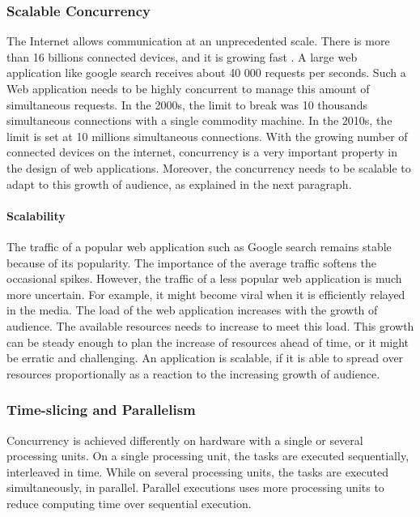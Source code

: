 
\subsubsection{Scalable Concurrency}

The Internet allows communication at an unprecedented scale.
There is more than 16 billions connected devices, and it is growing fast \cite{Hilbert2011}.
A large web application like google search receives about 40 000 requests per seconds.
Such a Web application needs to be highly concurrent to manage this amount of simultaneous requests.
In the 2000s, the limit to break was 10 thousands simultaneous connections with a single commodity machine.
In the 2010s, the limit is set at 10 millions simultaneous connections.
With the growing number of connected devices on the internet, concurrency is a very important property in the design of web applications.
Moreover, the concurrency needs to be scalable to adapt to this growth of audience, as explained in the next paragraph.

\paragraph{Scalability}

The traffic of a popular web application such as Google search remains stable because of its popularity.
The importance of the average traffic softens the occasional spikes.
However, the traffic of a less popular web application is much more uncertain.
For example, it might become viral when it is efficiently relayed in the media.
The load of the web application increases with the growth of audience.
The available resources needs to increase to meet this load.
This growth can be steady enough to plan the increase of resources ahead of time, or it might be erratic and challenging.
An application is scalable, if it is able to spread over resources proportionally as a reaction to the increasing growth of audience.

\subsubsection{Time-slicing and Parallelism}

Concurrency is achieved differently on hardware with a single or several processing units.
On a single processing unit, the tasks are executed sequentially, interleaved in time.
While on several processing units, the tasks are executed simultaneously, in parallel.
Parallel executions uses more processing units to reduce computing time over sequential execution.

